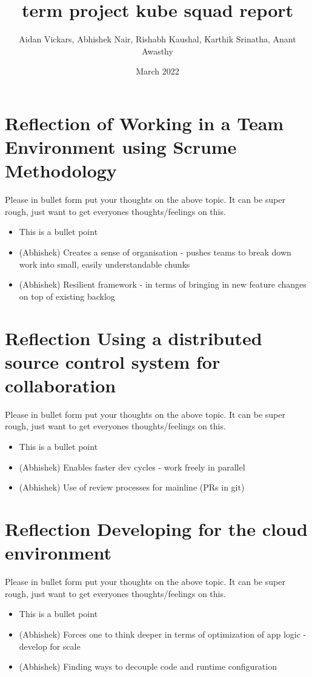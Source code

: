 \documentclass{article}
\title{term project kube squad report}
\author{Aidan Vickars, Abhishek Nair, Rishabh Kaushal, Karthik Srinatha, Anant Awasthy }
\date{March 2022}
\begin{document}
\maketitle

\section{Reflection of Working in a Team Environment using Scrume Methodology}

Please in bullet form put your thoughts on the above topic.  It can be super rough, just want to get everyones thoughts/feelings on this.
\begin{itemize}
  \item This is a bullet point
  \item (Abhishek) Creates a sense of organisation - pushes teams to break down work into small, easily understandable chunks
  \item (Abhishek) Resilient framework - in terms of bringing in new feature changes on top of existing backlog

\end{itemize}

\section{Reflection Using a distributed source control system for collaboration}

Please in bullet form put your thoughts on the above topic.  It can be super rough, just want to get everyones thoughts/feelings on this.
\begin{itemize}
  \item This is a bullet point
  \item (Abhishek) Enables faster dev cycles - work freely in parallel
  \item (Abhishek) Use of review processes for mainline (PRs in git)

\end{itemize}

\section{Reflection Developing for the cloud environment}

Please in bullet form put your thoughts on the above topic.  It can be super rough, just want to get everyones thoughts/feelings on this.
\begin{itemize}
  \item This is a bullet point
  \item (Abhishek) Forces one to think deeper in terms of optimization of app logic - develop for scale
  \item (Abhishek) Finding ways to decouple code and runtime configuration

\end{itemize}
\end{document}
